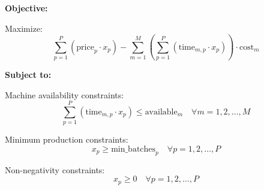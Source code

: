\documentclass{article}
\begin{document}
\textbf{Objective:}

Maximize:
\[
\sum_{p=1}^{P} (\text{price}_p \cdot x_p) - \sum_{m=1}^{M} \left(\sum_{p=1}^{P} (\text{time}_{m,p} \cdot x_p)\right) \cdot \text{cost}_m
\]

\textbf{Subject to:}

Machine availability constraints:
\[
\sum_{p=1}^{P} (\text{time}_{m,p} \cdot x_p) \leq \text{available}_m \quad \forall m = 1, 2, \ldots, M
\]

Minimum production constraints:
\[
x_p \geq \text{min\_batches}_p \quad \forall p = 1, 2, \ldots, P
\]

Non-negativity constraints:
\[
x_p \geq 0 \quad \forall p = 1, 2, \ldots, P
\]
\end{document}
